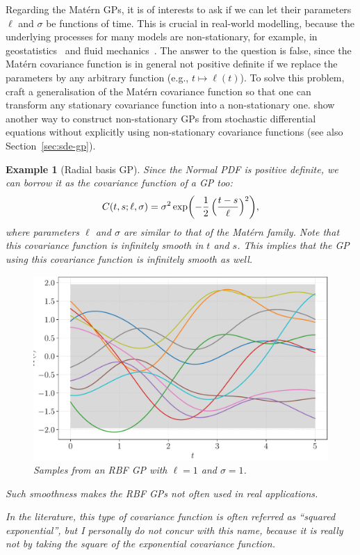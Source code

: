 \documentclass[]{article}
\newtheorem{example}[theorem]{Example}
\begin{document}
Regarding the Mat\'{e}rn GPs, it is of interests to ask if we can let their parameters $\ell$ and $\sigma$ be functions of time. This is crucial in real-world modelling, because the underlying processes for many models are non-stationary, for example, in geostatistics~\citep{Higdon1999} and fluid mechanics~\citep{Monin1971}. The answer to the question is false, since the Mat\'{e}rn covariance function is in general not positive definite if we replace the parameters by any arbitrary function (e.g., $t \mapsto \ell(t)$). To solve this problem, \citet{Paciorek2004} craft a generalisation of the Mat\'{e}rn covariance function so that one can transform any stationary covariance function into a non-stationary one. \citet{Zhao2020SSDGP} show another way to construct non-stationary GPs from stochastic differential equations without explicitly using non-stationary covariance functions (see also Section~\ref{sec:sde-gp}).

\begin{example}[Radial basis GP]
	Since the Normal PDF is positive definite, we can borrow it as the covariance function of a GP too:
	\begin{equation}
		C(t, s; \ell, \sigma) = \sigma^2 \exp\biggl(-\frac{1}{2} \, \Bigl(\frac{t - s}{\ell}\Bigr)^2\biggr),
		\label{equ:cov-rbf}
	\end{equation}
	where parameters $\ell$ and $\sigma$ are similar to that of the Mat\'{e}rn family. Note that this covariance function is infinitely smooth in $t$ and $s$. This implies that the GP using this covariance function is infinitely smooth as well. 
	\begin{figure}[t!]
		\centering
		\includegraphics[width=.7\linewidth]{figs/sample-rbf}
		\caption{Samples from an RBF GP with $\ell=1$ and $\sigma=1$.}
		\label{fig:rbf}
	\end{figure}
	Such smoothness makes the RBF GPs not often used in real applications.
	
	In the literature, this type of covariance function is often referred as ``squared exponential'', but I personally do not concur with this name, because it is really not by taking the square of the exponential covariance function. 
\end{example}
\end{document}
